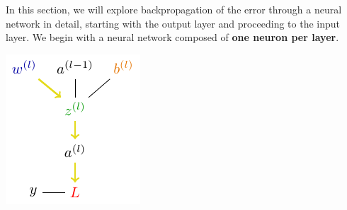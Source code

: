 In this section, we will explore backpropagation of the error through a neural network in detail, starting with the output layer and proceeding to the input layer. We begin with a neural network composed of \textbf{one neuron per layer}.

\begin{minipage}{0.45\textwidth}
\includegraphics[width=\textwidth]{tikz/chapter2 - Chain Rule One Layer.pdf}
\end{minipage}
